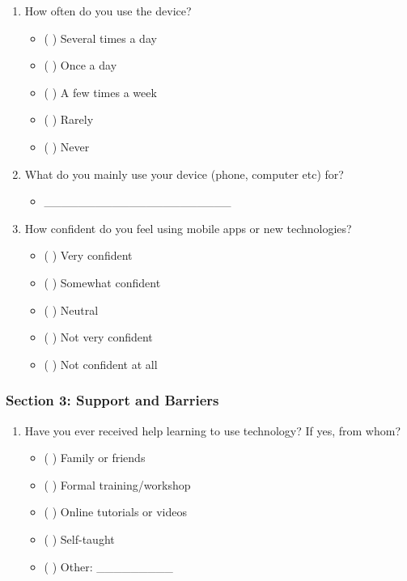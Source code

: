 \documentclass[acmlarge]{acmart}
\begin{document}
{\begin{enumerate}
    \item How often do you use the device?
    \begin{itemize}
        \item ( ) Several times a day
        \item ( ) Once a day
        \item ( ) A few times a week
        \item ( ) Rarely
        \item ( ) Never
    \end{itemize}
    
    \item What do you mainly use your device (phone, computer etc) for?
    \begin{itemize}
        \item \_\_\_\_\_\_\_\_\_\_\_\_\_\_\_\_\_\_\_\_\_\_
    \end{itemize}
    
    \item How confident do you feel using mobile apps or new technologies?
    \begin{itemize}
        \item ( ) Very confident
        \item ( ) Somewhat confident
        \item ( ) Neutral
        \item ( ) Not very confident
        \item ( ) Not confident at all
    \end{itemize}
\end{enumerate}

\subsubsection{Section 3: Support and Barriers}
\begin{enumerate}
    \item Have you ever received help learning to use technology? If yes, from whom?
    \begin{itemize}
        \item ( ) Family or friends
        \item ( ) Formal training/workshop
        \item ( ) Online tutorials or videos
        \item ( ) Self-taught
        \item ( ) Other: \_\_\_\_\_\_\_\_\_
    \end{itemize}
    

\end{enumerate}}
\end{document}
